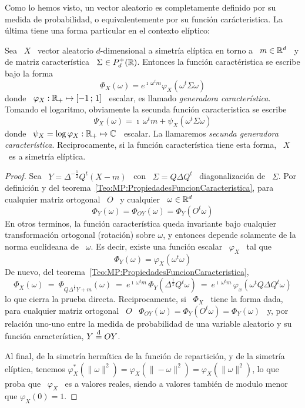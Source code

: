 Como lo hemos visto, un vector aleatorio es completamente definido por su medida
de  probabilidad,  o  equivalentemente  por su  funci\'on  car\'acteristica.  La
\'ultima tiene una forma particular en el contexto el\'iptico:
%
\begin{teorema}\label{Teo:MP:GeneradorasCaracteristicas}
%
  Sea \ $X$ \ vector aleatorio $d$-dimensional a simetr\'ia el\'iptica en torno a
  \   $m  \in  \mathbb{R}^d$   \  y   de  matriz   caracter\'istica  \   $\Sigma  \in
  P_d^+(\mathbb{R})$. Entonces la funci\'on caract\'eristica se escribe bajo la forma
  \[
  \Phi_X(\omega)  = e^{\imath  \,  \omega^t m}  \varphi_X\left( \omega^t  \Sigma
    \omega \right)
  \]
  donde  \  $\varphi_X:  \mathbb{R}_+  \mapsto  [-1 \, ; \, 1]$ \  escalar,  es  llamado  {\em
    generadora  caracter\'istica}. Tomando el  logaritmo, obviamente  la secunda
  funci\'on caracteristica se escribe
  \[
  \Psi_X(\omega) =  \imath \, \omega^t  m + \psi_X\left( \omega^t  \Sigma \omega
  \right)
  \]
  donde  \ $\psi_X  =  \log \varphi_X:  \mathbb{R}_+  \mapsto \mathbb{C}$  \ escalar.   La
  llamaremos  {\em secunda generadora  caracter\'istica}. Reciprocamente,  si la
  funci\'on caracter\'istica tiene esta forma, \ $X$ \ es a simetr\'ia el\'iptica.
\end{teorema}
%
\begin{proof}
  Sea \  $Y = \Delta^{-\frac12} Q^t  \left( X - m  \right)$ \ con \  $\Sigma = Q
  \Delta  Q^t$  \ diagonalizaci\'on  de  \  $\Sigma$.   Por definici\'on  y  del
  teorema~\ref{Teo:MP:PropiedadesFuncionCaracteristica},  para  cualquier matriz
  ortogonal \ $O$ \ y cualquier \ $\omega \in \mathbb{R}^d$
  \[
  \Phi_Y(\omega) = \Phi_{O Y}(\omega) = \Phi_Y(O^t \omega)
  \]
  En  otros  terminos,  la  funci\'on  caracter\'istica  queda  invariante  bajo
  cualquier transformaci\'on  ortogonal (rotaci\'on) sobre  $\omega$, y entonces
  depende solamente de  la norma euclideana de \ $\omega$.  Es decir, existe una
  funci\'on escalar \ $\varphi_X$ \ tal que
  \[
  \Phi_Y(\omega) = \varphi_X(\omega^t \omega)
  \]
  De nuevo, del teorema~\ref{Teo:MP:PropiedadesFuncionCaracteristica},
  \[
  \Phi_X(\omega)  \:  = \:  \Phi_{Q  \Delta^{\frac12} Y  +  m}(\omega)  \: =  \:
  e^{\imath  \, \omega^t  m} \,  \Phi_Y( \Delta^{\frac12}  Q^t \omega)  \:  = \:
  e^{\imath \, \omega^t m} \, \varphi_x( \omega^t Q \Delta Q^t \omega)
  \]
  lo que  cierra la  prueba directa.  Reciprocamente, si \  $\Phi_X$ \  tiene la
  forma  dada, para cualquier  matriz ortogonal  \ $O$  \ $\Phi_{O  Y}(\omega) =
  \Phi_Y( O^t  \omega ) = \Phi_Y(\omega)$  \ y, por relaci\'on  uno-uno entre la
  medida   de  probabilidad   de   una  variable   aleatorio   y  su   funci\'on
  caracter\'istica, $Y \stackrel{\mathrm{d}}{=} O Y$.

  Al final, de la simetr\'ia herm\'itica  de la funci\'on de repartici\'on, y de
  la simetr\'ia  el\'iptica, tenemos $\varphi_X^*\left(  \| \omega \|^2  \right) =
  \varphi_X\left(  \| -\omega  \|^2  \right) =  \varphi_X\left(  \| \omega  \|^2
  \right)$,  lo que proba  que \  $\varphi_X$ \  es a  valores reales,  siendo a
  valores tambi\'en de modulo menor que $\varphi_X(0) = 1$.
\end{proof}
